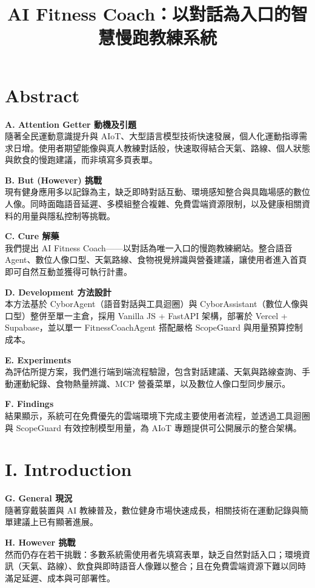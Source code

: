 \documentclass[12pt,a4paper]{article}
\title{\textbf{AI Fitness Coach：以對話為入口的智慧慢跑教練系統}}
\author{}
\date{}
\begin{document}
\maketitle

\section*{Abstract}

\textbf{A. Attention Getter 動機及引題} \\
隨著全民運動意識提升與 AIoT、大型語言模型技術快速發展，個人化運動指導需求日增。使用者期望能像與真人教練對話般，快速取得結合天氣、路線、個人狀態與飲食的慢跑建議，而非填寫多頁表單。

\textbf{B. But (However) 挑戰} \\
現有健身應用多以記錄為主，缺乏即時對話互動、環境感知整合與具臨場感的數位人像。同時面臨語音延遲、多模組整合複雜、免費雲端資源限制，以及健康相關資料的用量與隱私控制等挑戰。

\textbf{C. Cure 解藥} \\
我們提出 AI Fitness Coach——以對話為唯一入口的慢跑教練網站。整合語音 Agent、數位人像口型、天氣路線、食物視覺辨識與營養建議，讓使用者進入首頁即可自然互動並獲得可執行計畫。

\textbf{D. Development 方法設計} \\
本方法基於 CyborAgent（語音對話與工具迴圈）與 CyborAssistant（數位人像與口型）整併至單一主倉，採用 Vanilla JS + FastAPI 架構，部署於 Vercel + Supabase，並以單一 FitnessCoachAgent 搭配嚴格 ScopeGuard 與用量預算控制成本。

\textbf{E. Experiments} \\
為評估所提方案，我們進行端到端流程驗證，包含對話建議、天氣與路線查詢、手動運動紀錄、食物熱量辨識、MCP 營養菜單，以及數位人像口型同步展示。

\textbf{F. Findings} \\
結果顯示，系統可在免費優先的雲端環境下完成主要使用者流程，並透過工具迴圈與 ScopeGuard 有效控制模型用量，為 AIoT 專題提供可公開展示的整合架構。

\section{I. Introduction}

\textbf{G. General 現況} \\
隨著穿戴裝置與 AI 教練普及，數位健身市場快速成長，相關技術在運動記錄與簡單建議上已有顯著進展。

\textbf{H. However 挑戰} \\
然而仍存在若干挑戰：多數系統需使用者先填寫表單，缺乏自然對話入口；環境資訊（天氣、路線）、飲食與即時語音人像難以整合；且在免費雲端資源下難以同時滿足延遲、成本與可部署性。
\end{document}
